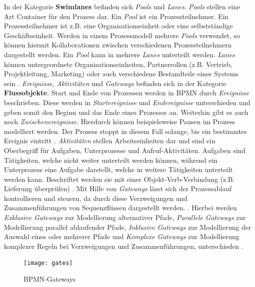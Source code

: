 In der Kategorie \textbf{Swimlanes} befinden sich \textit{Pools} und \textit{Lanes}. \textit{Pools} stellen eine Art Container für den Prozess dar. Ein \textit{Pool} ist ein Prozessteilnehmer. Ein Prozessteilnehmer ist z.B. eine Organisationseinheit oder eine selbstständige Geschäftseinheit. Werden in einem Prozessmodell mehrere \textit{Pools} verwendet, so können hiermit Kollaborationen zwischen verschiedenen Prozessteilnehmern dargestellt werden. Ein \textit{Pool} kann in mehrere \textit{Lanes} unterteilt werden. \textit{Lanes} können untergeordnete Organisationseinheiten, Partnerrollen (z.B. Vertrieb, Projektleitung, Marketing) oder auch verschiedene Bestandteile eines Systems sein \cite{gpfert2012, pitschke2010, allweyer2013}. \newline
 \textit{Ereignisse}, \textit{Aktivitäten} und \textit{Gateways} befinden sich in der Kategorie \textbf{Flussobjekte}.
Start und Ende von Prozessen werden in BPMN durch \textit{Ereignisse} beschrieben. Diese werden in  \textit{Startereignisse} und \textit{Endereignisse} unterschieden und geben somit den Beginn und das Ende eines Prozesses an. Weiterhin gibt es auch noch \textit{Zwischenereignisse}. Hierdurch können beispielsweise Pausen im Prozess modelliert werden. Der Prozess stoppt in diesem Fall solange, bis ein bestimmtes Ereignis eintritt \cite{allweyer2013}. \newline
\textit{Aktivitäten} stellen Arbeitseinheiten dar und sind ein Oberbegriff für Aufgaben, Unterprozesse und Aufruf-Aktivitäten. Aufgaben sind Tätigkeiten, welche nicht weiter unterteilt werden können, während ein Unterprozess eine Aufgabe darstellt, welche in weitere Tätigkeiten unterteilt werden kann. Beschriftet werden sie mit einer Objekt-Verb-Verbindung (z.B. Lieferung überprüfen) \cite{gpfert2012}. \newline
Mit Hilfe von \textit{Gateways} lässt sich der Prozessablauf kontrollieren und steuern, da durch diese Verzweigungen und Zusammenführungen von Sequenzflüssen dargestellt werden. \cite{gpfert2012, allweyer2013}. Hierbei werden \textit{Exklusive Gateways} zur Modellierung alternativer Pfade, \textit{Parallele Gateways} zur Modellierung parallel ablaufender Pfade, \textit{Inklusive Gateways} zur Modellierung der Auswahl eines oder mehrerer Pfade und \textit{Komplexe Gateways} zur Modellierung komplexer Regeln bei Verzweigungen und Zusammenführungen, unterschieden \cite{allweyer2013}.\newline 

\begin{figure}[H]
\begin{center}
  \texttt{[image: gates]} %
  \caption{BPMN-Gateways}
  \label{fig:gates}
\end{center}
\end{figure} 



